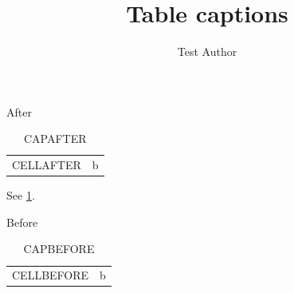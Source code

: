 \documentclass[aspectratio=169,10pt]{beamer}
\title{Table captions}
\author{Test Author}
\begin{document}
\begin{frame}{After}
	\begin{table}
		\begin{tabular}{ll} CELLAFTER & b \\ \end{tabular}
		\caption{CAPAFTER}
		\label{tab:after}
	\end{table}
	See \cref{tab:after}.
\end{frame}
\begin{frame}{Before}
	\begin{table}
		\caption{CAPBEFORE}
		\begin{tabular}{ll} CELLBEFORE & b \\ \end{tabular}
	\end{table}
\end{frame}
\end{document}
